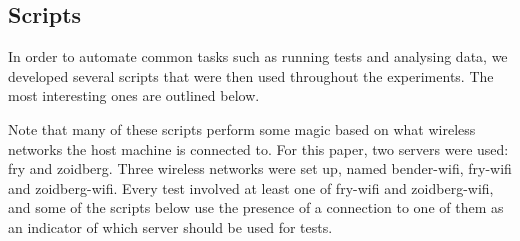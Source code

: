 \subsection{Scripts}
\label{sec:met:scripts}
In order to automate common tasks such as running tests and analysing data, we
developed several scripts that were then used throughout the experiments. The
most interesting ones are outlined below.

Note that many of these scripts perform some magic based on what wireless
networks the host machine is connected to. For this paper, two servers were
used: fry and zoidberg. Three wireless networks were set up, named bender-wifi,
fry-wifi and zoidberg-wifi. Every test involved at least one of fry-wifi and
zoidberg-wifi, and some of the scripts below use the presence of a connection to
one of them as an indicator of which server should be used for tests.


